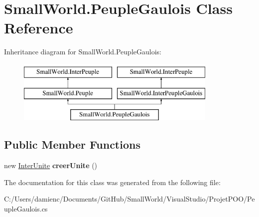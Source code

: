\hypertarget{class_small_world_1_1_peuple_gaulois}{\section{Small\-World.\-Peuple\-Gaulois Class Reference}
\label{class_small_world_1_1_peuple_gaulois}
}
Inheritance diagram for Small\-World.\-Peuple\-Gaulois\-:\begin{figure}[H]
\begin{center}
\leavevmode
\includegraphics[height=3.000000cm]{class_small_world_1_1_peuple_gaulois}
\end{center}
\end{figure}
\subsection*{Public Member Functions}
\begin{DoxyCompactItemize}
\item 
\hypertarget{class_small_world_1_1_peuple_gaulois_aaa119ff42c8673054a18e4fba230d9e2}{new \hyperlink{interface_small_world_1_1_inter_unite}{Inter\-Unite} {\bfseries creer\-Unite} ()}\label{class_small_world_1_1_peuple_gaulois_aaa119ff42c8673054a18e4fba230d9e2}

\end{DoxyCompactItemize}


The documentation for this class was generated from the following file\-:\begin{DoxyCompactItemize}
\item 
C\-:/\-Users/damienc/\-Documents/\-Git\-Hub/\-Small\-World/\-Visual\-Studio/\-Projet\-P\-O\-O/Peuple\-Gaulois.\-cs\end{DoxyCompactItemize}
